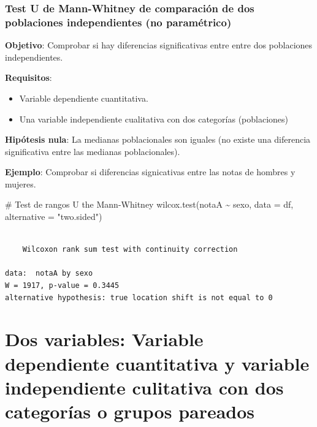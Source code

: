 \documentclass[
  a4paper,
]{scrreport}
\newenvironment{Shaded}{\begin{snugshade}}{\end{snugshade}}
\newcommand{\AttributeTok}[1]{\textcolor[rgb]{0.40,0.45,0.13}{#1}}
\newcommand{\CommentTok}[1]{\textcolor[rgb]{0.37,0.37,0.37}{#1}}
\newcommand{\FunctionTok}[1]{\textcolor[rgb]{0.28,0.35,0.67}{#1}}
\newcommand{\NormalTok}[1]{\textcolor[rgb]{0.00,0.23,0.31}{#1}}
\newcommand{\SpecialCharTok}[1]{\textcolor[rgb]{0.37,0.37,0.37}{#1}}
\newcommand{\StringTok}[1]{\textcolor[rgb]{0.13,0.47,0.30}{#1}}
\providecommand{\tightlist}{%
  \setlength{\itemsep}{0pt}\setlength{\parskip}{0pt}}\usepackage{longtable,booktabs,array}
\theoremstyle{definition}
\theoremstyle{definition}
\theoremstyle{remark}
\begin{document}
\hypertarget{test-u-de-mann-whitney-de-comparaciuxf3n-de-dos-poblaciones-independientes-no-paramuxe9trico}{%
\subsubsection{Test U de Mann-Whitney de comparación de dos poblaciones
independientes (no
paramétrico)}\label{test-u-de-mann-whitney-de-comparaciuxf3n-de-dos-poblaciones-independientes-no-paramuxe9trico}}

\textbf{Objetivo}: Comprobar si hay diferencias significativas entre
entre dos poblaciones independientes.

\textbf{Requisitos}:

\begin{itemize}
\tightlist
\item
  Variable dependiente cuantitativa.
\item
  Una variable independiente cualitativa con dos categorías
  (poblaciones)
\end{itemize}

\textbf{Hipótesis nula}: La medianas poblacionales son iguales (no
existe una diferencia significativa entre las medianas poblacionales).

\textbf{Ejemplo}: Comprobar si diferencias signicativas entre las notas
de hombres y mujeres.

\begin{Shaded}
\begin{Highlighting}[]
\CommentTok{\# Test de rangos U the Mann{-}Whitney}
\FunctionTok{wilcox.test}\NormalTok{(notaA }\SpecialCharTok{\textasciitilde{}}\NormalTok{ sexo, }\AttributeTok{data =}\NormalTok{ df, }\AttributeTok{alternative =} \StringTok{"two.sided"}\NormalTok{)}
\end{Highlighting}
\end{Shaded}

\begin{verbatim}

    Wilcoxon rank sum test with continuity correction

data:  notaA by sexo
W = 1917, p-value = 0.3445
alternative hypothesis: true location shift is not equal to 0
\end{verbatim}

\hypertarget{dos-variables-variable-dependiente-cuantitativa-y-variable-independiente-culitativa-con-dos-categoruxedas-o-grupos-pareados}{%
\section{Dos variables: Variable dependiente cuantitativa y variable
independiente culitativa con dos categorías o grupos
pareados}\label{dos-variables-variable-dependiente-cuantitativa-y-variable-independiente-culitativa-con-dos-categoruxedas-o-grupos-pareados}}
\end{document}

